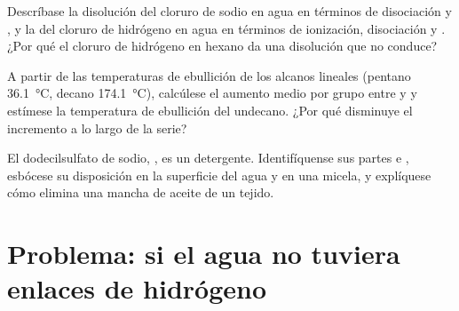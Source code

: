 \begin{exercise}[$\star\star\star$]\label{exo:b1:intermolecular-forces-solvents:10}
Descríbase la disolución del cloruro de sodio en agua en términos de
disociación y , y la del cloruro de hidrógeno en agua en
términos de ionización, disociación y . ¿Por qué el cloruro de
hidrógeno en hexano da una disolución que no conduce?
\end{exercise}

\begin{exercise}[$\star\star\star$]\label{exo:b1:intermolecular-forces-solvents:11}
A partir de las temperaturas de ebullición de los alcanos lineales
(pentano \qty{36.1}{\celsius}, decano \qty{174.1}{\celsius}), calcúlese
el aumento medio por grupo  entre  y  y estímese
la temperatura de ebullición del undecano. ¿Por qué disminuye el
incremento a lo largo de la serie?
\end{exercise}

\begin{exercise}[$\star\star\star$]\label{exo:b1:intermolecular-forces-solvents:12}
El dodecilsulfato de sodio, , es un detergente.
Identifíquense sus partes  e , esbócese su disposición
en la superficie del agua y en una micela, y explíquese cómo elimina una
mancha de aceite de un tejido.
\end{exercise}

\section{Problema: si el agua no tuviera enlaces de hidrógeno}

